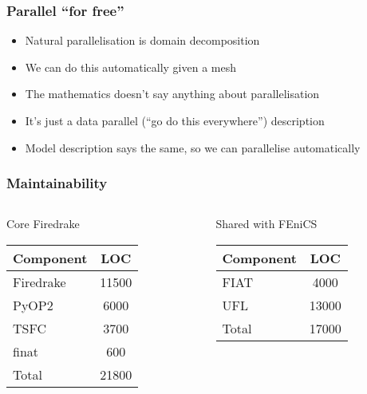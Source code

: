 \documentclass[presentation]{beamer}
\begin{document}
\begin{frame}
  \frametitle{Parallel ``for free''}
  \begin{itemize}
  \item Natural parallelisation is domain decomposition
  \item We can do this automatically given a mesh
  \item The mathematics doesn't say anything about parallelisation
  \item It's just a data parallel (``go do this everywhere'')
    description
  \item Model description says the same, so we can parallelise
    automatically
  \end{itemize}
\end{frame}

\begin{frame}
  \frametitle{Maintainability}
  \begin{columns}
    \begin{column}[t]{0.5\textwidth}
      \begin{block}{Core Firedrake}
        \begin{table}
          \centering
          \begin{tabular}{lc}
            Component & LOC   \\
            \hline
            Firedrake & 11500 \\
            PyOP2     & 6000  \\
            TSFC      & 3700  \\
            finat     & 600   \\
            \hline
            Total     & 21800
          \end{tabular}
        \end{table}
      \end{block}
    \end{column}
    \begin{column}[t]{0.5\textwidth}
      \begin{block}{Shared with FEniCS}
        \begin{table}
          \centering
          \begin{tabular}{lc}
            Component & LOC   \\
            \hline
            FIAT      & 4000  \\
            UFL       & 13000 \\
            \hline
            Total     & 17000
          \end{tabular}
        \end{table}        
      \end{block}
    \end{column}
  \end{columns}
\end{frame}
\end{document}
